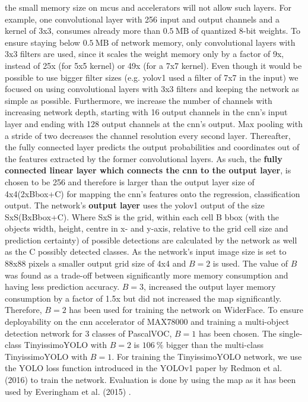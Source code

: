 \documentclass[conference]{IEEEtran}
\begin{document}
 the small memory size on \glspl{mcu} and accelerators will not allow such layers. For example, one convolutional layer with 256 input and output channels and a kernel of 3x3, consumes already more than $\SI{0.5}{\text{MB}}$ of quantized 8-bit weights. To ensure staying below $\SI{0.5}{\text{MB}}$ of network memory, only convolutional layers with 3x3 filters are used, since it scales the weight memory only by a factor of 9x, instead of 25x (for 5x5 kernel) or 49x (for a 7x7 kernel). Even though it would be possible to use bigger filter sizes (e.g. \gls{yolo}v1 used a filter of 7x7 in the input) we focused on using convolutional layers with 3x3 filters and keeping the network as simple as possible. Furthermore, we increase the number of channels with increasing network depth, starting with 16 output channels in the \gls{cnn}'s input layer and ending with 128 output channels at the \gls{cnn}'s output. Max pooling with a stride of two decreases the channel resolution every second layer. 
 Thereafter, the fully connected layer predicts the output probabilities and coordinates out of the features extracted by the former convolutional layers. As such, the \textbf{fully connected linear layer which connects the \gls{cnn} to the output layer}, is chosen to be 256 and therefore is larger than the output layer size of 4x4(2xBbox+C) for mapping the \gls{cnn}'s features onto the regression, classification output.
The network's \textbf{output layer} uses the \gls{yolo}v1 output of the size SxS(BxBbox+C). Where SxS is the grid, within each cell B \gls{bbox} (with the objects width, height, centre in x- and y-axis, relative to the grid cell size and prediction certainty) of possible detections are calculated by the network as well as the C possibly detected classes. As the network's input image size is set to 88x88 pixels a smaller output grid size of 4x4 and $B=2$ is used. The value of $B$ was found as a trade-off between significantly more memory consumption and having less prediction accuracy. $B=3$, increased the output layer memory consumption by a factor of 1.5x but did not increased the \gls{map} significantly. Therefore, $B=2$ has been used for training the network on WiderFace. To ensure deployability on the \gls{cnn} accelerator of MAX78000 and training a multi-object detection network for 3 classes of PascalVOC, $B=1$ has been chosen. The single-class TinyissimoYOLO with $B=2$ is $\SI{106}{\percent}$ bigger than the multi-class TinyissimoYOLO with $B=1$. 
For training the TinyissimoYOLO network, we use the YOLO loss function introduced in the YOLOv1 paper \cite{redmon_you_2016} by Redmon et al. (2016) to train the network. Evaluation is done by using the \gls{map} as it has been used by Everingham et al. (2015) \cite{everingham_pascal_2015}.
\end{document}
